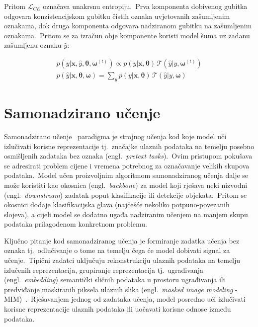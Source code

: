 \documentclass[diplomskirad]{fer}
\begin{document}
Pritom $\mathcal{L}_{CE}$ označava unakrsnu entropiju.\ Prva komponenta dobivenog gubitka odgovara konzistencijskom gubitku čistih oznaka uvjetovanih zašumljenim oznakama, dok druga komponenta odgovara nadziranom gubitku na zašumljenim oznakama.\ 
Pritom se za izračun obje komponente koristi model šuma uz zadanu zašumljenu oznaku $\hat{y}$:

\begin{equation}
  \begin{aligned}
    p(y | \bm{x}, \hat{y}, \bm{\theta}, \bm{\omega}^{(t)}) \propto p(y | \bm{x}, \bm{\theta}) \, \mathcal{T}(\hat{y} | y, \bm{\omega}^{(t)}) \\
    p(\hat{y} | \bm{x}, \bm{\theta}, \bm{\omega}) = \sum_{y} p(y | \bm{x}, \bm{\theta}) \, \mathcal{T}(\hat{y} | y, \bm{\omega})
  \end{aligned}
  \label{eq:ill_probs}
\end{equation}

\chapter{Samonadzirano učenje}
\label{pog:samonadzirano}

Samonadzirano učenje~\cite{jaiswal2020survey} paradigma je strojnog učenja kod koje model uči izlučivati korisne reprezentacije tj.\ značajke ulaznih podataka na temelju posebno osmišljenih zadataka bez oznaka (engl.\ \textit{pretext tasks}).\ 
Ovim pristupom pokušava se adresirati problem cijene i vremena potrebnog za označavanje velikih skupova podataka.\ 
Model učen proizvoljnim algoritmom samonadziranog učenja dalje se može koristiti kao okosnica (engl.\ \textit{backbone}) za model koji rješava neki nizvodni (engl.\ \textit{downstream}) zadatak poput klasifikacije ili detekcije objekata.\ 
Pritom se okosnici dodaje klasifikacijska glava (najčešće nekoliko potpuno-povezanih slojeva), a cijeli model se dodatno ugađa nadziranim učenjem na manjem skupu podataka prilagođenom konkretnom problemu.\ 
  
Ključno pitanje kod samonadziranog učenja je formiranje zadatka učenja bez oznaka tj.\ odlučivanje o tome na temelju čega će model dobivati signal za učenje.\ 
Tipični zadatci uključuju rekonstrukciju ulaznih podataka na temelju izlučenih reprezentacija, grupiranje reprezentacija tj.\ ugrađivanja (engl.\ \textit{embedding}) semantički sličnih podataka u prostoru ugrađivanja ili predviđanje maskiranih piksela ulaznih slika (engl.\ \textit{masked image modeling} - MIM)~\cite{hondru2024masked}.\
Rješavanjem jednog od zadataka učenja, model posredno uči izlučivati korisne reprezentacije ulaznih podataka ili uočavati korisne odnose između podataka.\ 
  
\end{document}
